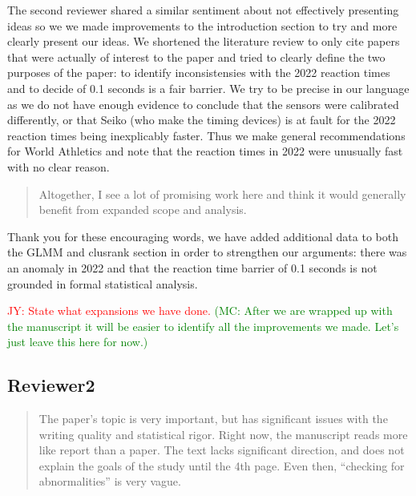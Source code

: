 \documentclass[12pt]{article}
\newcommand{\jy}[1]{\textcolor{red}{JY: #1}}
\newcommand{\of}[1]{\textcolor{green}{(MC: #1)}}
\newenvironment{comment}%
{\begin{quotation}\noindent\small\it\color{darkblue}\ignorespaces%
}{\end{quotation}}
\begin{document}
The second reviewer shared a similar sentiment about not effectively
presenting ideas so we we made improvements to the introduction section to try
and more clearly present our ideas.  We shortened the literature review to only
cite papers that were actually of interest to the paper and tried to clearly
define the two purposes of the paper: to identify inconsistensies with the 2022
reaction times and to decide of 0.1 seconds is a fair barrier. We try to be precise in
our language as we do not have enough evidence to conclude that the sensors were
calibrated differently, or that Seiko (who make the timing devices) is at fault
for the 2022 reaction times being inexplicably faster. Thus we make general
recommendations for World Athletics and note that the reaction times in 2022
were unusually fast with no clear reason.

\begin{comment}
Altogether, I see a lot of promising work here and think it would generally
benefit from expanded scope and analysis.
\end{comment}


Thank you for these encouraging words, we have added additional data to both
the GLMM and clusrank section in order to strengthen our arguments: there was
an anomaly in 2022 and that the reaction time barrier of 0.1 seconds is not
grounded in formal statistical analysis.

\jy{State what expansions we
  have done.}
\of{After we are wrapped up with the manuscript it will be easier to identify
all the improvements we made. Let's just leave this here for now.}  

\subsection*{Reviewer2}


\begin{comment}
The paper’s topic is very important, but has significant issues with the writing
quality and statistical rigor. Right now, the manuscript reads more like report
than a paper. The text lacks significant direction, and does not explain the
goals of the study until the 4th page. Even then, “checking for abnormalities”
is very vague.
\end{comment}
\end{document}
